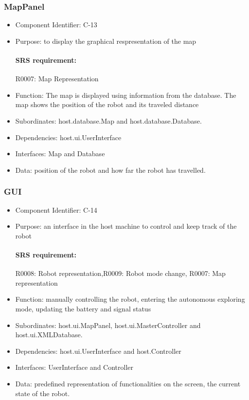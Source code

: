 \documentclass[11pt, a4paper]{report}
\begin{document}
\subsubsection{MapPanel}
\begin{itemize}
\item Component Identifier: C-13
\item Purpose: to display the graphical respresentation of the map
\paragraph{SRS requirement:} R0007: Map Representation
\item Function: The map is displayed using information from the database. The map shows
the position of the robot and its traveled distance
\item Subordinates: host.database.Map and host.database.Database.
\item Dependencies: host.ui.UserInterface
\item Interfaces: Map and Database
\item Data: position of the robot and how far the robot has travelled.
\end{itemize}
% 

\subsubsection{GUI}
\begin{itemize}
\item Component Identifier: C-14
\item Purpose: an interface in the host machine to control and keep track of the robot
\paragraph{SRS requirement:} R0008: Robot representation,R0009: Robot mode change,
R0007: Map representation
\item Function: manually controlling the robot, entering the autonomous exploring mode, updating
the battery and signal status
\item Subordinates: host.ui.MapPanel, host.ui.MasterController and host.ui.XMLDatabase. 
\item Dependencies: host.ui.UserInterface and host.Controller
\item Interfaces: UserInterface and Controller
\item Data: predefined representation of functionalities on the screen, the current state of the robot.
\end{itemize}
\end{document}
